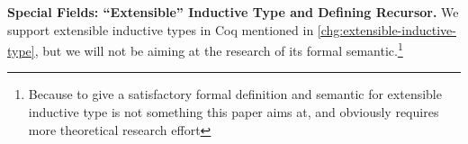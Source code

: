 



\textbf{Special Fields: ``Extensible'' Inductive Type and Defining Recursor.}
We support extensible inductive types in Coq mentioned in
\ref{chg:extensible-inductive-type}, but we will not be aiming at the
research of its formal semantic.\footnote{Because to give a satisfactory
formal definition and semantic for extensible inductive type is not
something this paper aims at, and obviously requires more theoretical
research effort}

